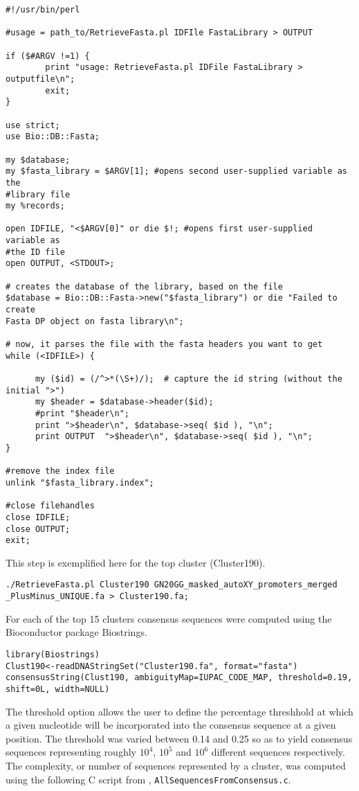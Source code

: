 \begin{lstlisting}
#!/usr/bin/perl

#usage = path_to/RetrieveFasta.pl IDFIle FastaLibrary > OUTPUT

if ($#ARGV !=1) {
        print "usage: RetrieveFasta.pl IDFile FastaLibrary > outputfile\n";
        exit;
}

use strict;
use Bio::DB::Fasta;

my $database;
my $fasta_library = $ARGV[1]; #opens second user-supplied variable as the 
#library file
my %records;

open IDFILE, "<$ARGV[0]" or die $!; #opens first user-supplied variable as 
#the ID file
open OUTPUT, <STDOUT>;

# creates the database of the library, based on the file
$database = Bio::DB::Fasta->new("$fasta_library") or die "Failed to create 
Fasta DP object on fasta library\n";

# now, it parses the file with the fasta headers you want to get
while (<IDFILE>) {

      my ($id) = (/^>*(\S+)/);  # capture the id string (without the initial ">")
      my $header = $database->header($id);
      #print "$header\n";
      print ">$header\n", $database->seq( $id ), "\n";
      print OUTPUT  ">$header\n", $database->seq( $id ), "\n";
}

#remove the index file 
unlink "$fasta_library.index";

#close filehandles
close IDFILE;
close OUTPUT;
exit;
\end{lstlisting}

This step is exemplified here  for the top cluster (Cluster190).

\begin{lstlisting}
./RetrieveFasta.pl Cluster190 GN20GG_masked_autoXY_promoters_merged
_PlusMinus_UNIQUE.fa > Cluster190.fa;
\end{lstlisting}

For each of the top 15 clusters consensus sequences were computed using the Bioconductor package Biostrings.

\begin{lstlisting}
library(Biostrings)
Clust190<-readDNAStringSet("Cluster190.fa", format="fasta") 
consensusString(Clust190, ambiguityMap=IUPAC_CODE_MAP, threshold=0.19,
shift=0L, width=NULL) 
\end{lstlisting}

The threshold option allows the user to define the percentage threshhold at which a given nucleotide will be incorporated into the consensus sequence at a given position. The threshold was varied between 0.14 and 0.25 so as to yield consensus sequences representing roughly $10^4$, $10^5$ and $10^6$ different sequences respectively. The complexity, or number of sequences represented by a cluster, was computed using the following C script from \cite{Lindenbaum:Online}, \verb|AllSequencesFromConsensus.c|.

